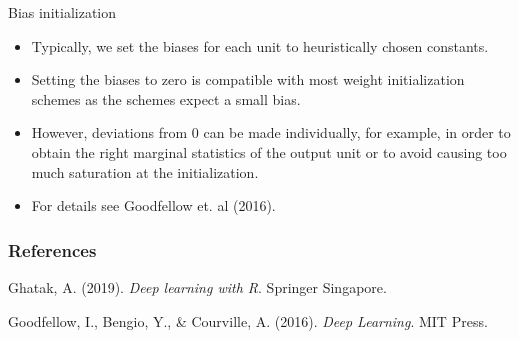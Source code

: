 \begin{vbframe}{Bias initialization}
  \begin{itemize}
    \item Typically, we set the biases for each unit to heuristically chosen constants. 
    \item Setting the biases to zero is compatible with most weight
initialization schemes as the schemes expect a small bias. 
    \item However, deviations from 0 can be made individually, for example, in order to obtain the right marginal statistics of the output unit or to avoid causing too much saturation at the initialization.
    \item For details see Goodfellow et. al (2016).
  \end{itemize}
\end{vbframe}



\begin{vbframe}
\frametitle{References}
\footnotesize{
\begin{thebibliography}{99}
 Ghatak, A. (2019). \textit{Deep learning with R}. Springer Singapore. 

Goodfellow, I., Bengio, Y., \& Courville, A. (2016). \textit{Deep Learning}. MIT Press.
\end{thebibliography}
}
\end{vbframe}




\endlecture











